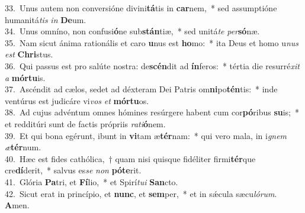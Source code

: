 {33.~}Unus autem non conversióne divini\textbf{tá}tis in \textbf{car}nem,~* sed assumptióne humanitá\textit{tis} \textit{in} \textbf{De}um.\\
{34.~}Unus omníno, non confusi\textbf{ó}ne sub\textbf{stán}tiæ,~* sed unitá\textit{te} \textit{per}\textbf{só}næ.\\
{35.~}Nam sicut ánima rationális et caro \textbf{u}nus est \textbf{ho}mo:~* ita Deus et homo u\textit{nus} \textit{est} \textbf{Chri}stus.\\
{36.~}Qui passus est pro salúte nostra: de\textbf{scén}dit ad \textbf{ín}feros:~* tértia die resurré\textit{xit} \textit{a} \textbf{mór}\textbf{tu}is.\\
{37.~}Ascéndit ad cælos, sedet ad déxteram Dei Patris om\textbf{ni}po\textbf{tén}tis:~* inde ventúrus est judicáre vi\textit{vos} \textit{et} \textbf{mór}\textbf{tu}os.\\
{38.~}Ad cujus advéntum omnes hómines resúrgere habent cum cor\textbf{pó}ribus \textbf{su}is;~* et redditúri sunt de factis própriis \textit{ra}\textit{ti}\textbf{ó}nem.\\
{39.~}Et qui bona egérunt, ibunt in \textbf{vi}tam æ\textbf{tér}nam:~* qui vero mala, in i\textit{gnem} \textit{æ}\textbf{tér}num.\\
{40.~}Hæc est fides cathólica,~† quam nisi quisque fidéliter firmi\textbf{tér}que cre\textbf{dí}derit,~* salvus es\textit{se} \textit{non} \textbf{pó}\textbf{te}rit.\\
{41.~}Glória \textbf{Pa}tri, et \textbf{Fí}lio,~* et Spirí\textit{tu}\textit{i} \textbf{San}cto.\\
{42.~}Sicut erat in princípio, et \textbf{nunc}, et \textbf{sem}per,~* et in sǽcula sæcu\textit{ló}\textit{rum}. \textbf{A}men.\\
